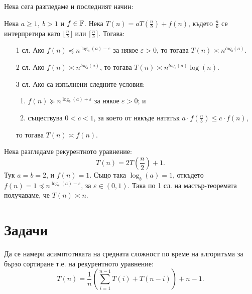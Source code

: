 Нека сега разгледаме и последният начин:
\begin{theorem}
    Нека $a \geq 1, \: b > 1$ и $f \in \mathbb{F}$.
    Нека $T(n) = aT(\frac{n}{b}) + f(n)$, където $\frac{n}{b}$ се интерпретира като $\lfloor \frac{n}{b} \rfloor$ или $\lceil \frac{n}{b} \rceil$.
    Тогава:
    \begin{itemize}
        \item[1 сл.] Ако $f(n) \preceq n^{\log_b(a) - \varepsilon}$ за някое $\varepsilon > 0$, то тогава $T(n) \asymp n^{log_b(a)}$.
        \item[2 сл.] Ако $f(n) \asymp n^{log_b(a)}$, то тогава $T(n) \asymp n^{log_b(a)} \log(n)$.
        \item[3 сл.] Ако са изпълнени следните условия:
              \begin{enumerate}
                  \item $f(n) \succeq n^{\log_b(a) + \varepsilon}$ за някое $\varepsilon > 0$; и
                  \item съществува $0 < c < 1$, за което от някъде нататък $a \cdot f(\frac{n}{b}) \leq c \cdot f(n)$,
              \end{enumerate}
              то тогава $T(n) \asymp f(n)$.
    \end{itemize}
\end{theorem}

Нека разгледаме рекурентното уравнение:
\[
    T(n) = 2T(\frac{n}{2}) + 1.
\]
Тук $a = b = 2$, и $f(n) = 1$.
Също така $\log_b(a) = 1$, откъдето $f(n) = 1 \preceq n^{\log_b(a) - \varepsilon}$, за $\varepsilon \in (0, 1)$.
Така по 1 сл. на мастър-теоремата получаваме, че $T(n) \asymp n$.

\section{Задачи}

\begin{problem}
Да се намери асимптотиката на средната сложност по време на алгоритъма за бързо сортиране т.е. на рекурентното уравнение:
\[
    T(n) = \frac{1}{n} \left(\sum\limits_{i = 1}^{n - 1}T(i) + T(n - i)\right) + n - 1.
\]
\end{problem}

